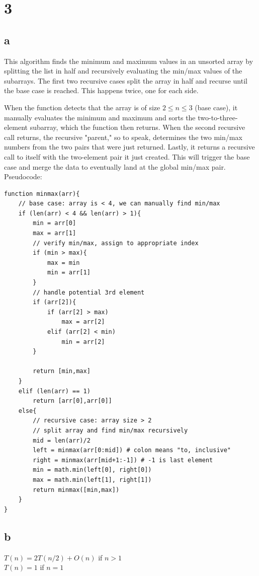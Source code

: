 \documentclass[10pt,a4paper]{report}
\begin{document}
	\newpage
	\section*{3}
	\subsection*{a}
	This algorithm finds the minimum and maximum values in an unsorted array by splitting the list in half and recursively evaluating the min/max values of the subarrays. The first two recursive cases split the array in half and recurse until the base case is reached. This happens twice, one for each side.
	
	When the function detects that the array is of size $2 \le n \le 3$ (base case), it manually evaluates the minimum and maximum and sorts the two-to-three-element subarray, which the function then returns. When the second recursive call returns, the recursive "parent," so to speak, determines the two min/max numbers from the two pairs that were just returned. Lastly, it returns a recursive call to itself with the two-element pair it just created. This will trigger the base case and merge the data to eventually land at the global min/max pair.
	\\
	
	\noindent
	Pseudocode:
	
	\begin{lstlisting}
function minmax(arr){
	// base case: array is < 4, we can manually find min/max
	if (len(arr) < 4 && len(arr) > 1){
		min = arr[0]
		max = arr[1]
		// verify min/max, assign to appropriate index
		if (min > max){
			max = min
			min = arr[1]
		}
		// handle potential 3rd element
		if (arr[2]){
			if (arr[2] > max)
				max = arr[2]
			elif (arr[2] < min)
				min = arr[2]
		}
		
		return [min,max]
	}
	elif (len(arr) == 1)
		return [arr[0],arr[0]]
	else{
		// recursive case: array size > 2
		// split array and find min/max recursively
		mid = len(arr)/2
		left = minmax(arr[0:mid]) # colon means "to, inclusive"
		right = minmax(arr[mid+1:-1]) # -1 is last element
		min = math.min(left[0], right[0])
		max = math.min(left[1], right[1])
		return minmax([min,max])
	}
}
	\end{lstlisting}

	\newpage
	\subsection*{b}
	$T(n) = 2T(n/2) + O(n)$ if $n > 1$
	\\
	$T(n) = 1$ if $n = 1$
	
\end{document}
